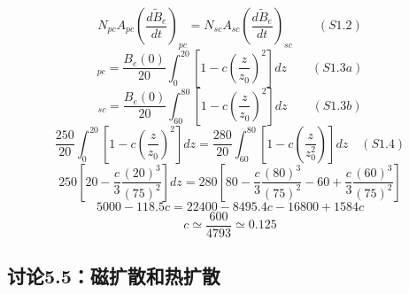 \begin{equation}%
N_{pc}A_{pc}(\frac{d\tilde{B}_{e}}{dt})_{pc}=N_{sc}A_{sc}(\frac{d\tilde{B}_{e}}{dt})_{sc}\qquad(S1.2)
\end{equation}
\begin{equation}%
[\tilde{B}_{e}]_{pc}=\frac{B_{e}(0)}{20}\int_{0}^{20}[1-c(\frac{z}{z_{0}})^{2}]dz\qquad(S1.3a)
\end{equation}
\begin{equation}%
[\tilde{B}_{e}]_{sc}=\frac{B_{e}(0)}{20}\int_{60}^{80}[1-c(\frac{z}{z_{0}})^{2}]dz\qquad(S1.3b)
\end{equation}
\begin{equation}%
\frac{250}{20}\int_{0}^{20}[1-c(\frac{z}{z_{0}})^{2}]dz=\frac{280}{20}\int_{60}^{80}[1-c(\frac{z}{z_{0}^{2}})]dz\quad(S1.4)
\end{equation}
\begin{equation}%
250[20-\frac{c}{3}\frac{(20)^{3}}{(75)^{2}}]dz=280[80-\frac{c}{3}\frac{(80)^{3}}{(75)^{2}}-60+\frac{c}{3}\frac{(60)^{3}}{(75)^{2}}]
\end{equation}
\begin{equation}%
5000-118.5c=22400-8495.4c-16800+1584c
\end{equation}
\begin{equation}%
c\simeq\frac{600}{4793}\simeq0.125
\end{equation}



\subsection{讨论5.5：磁扩散和热扩散}


